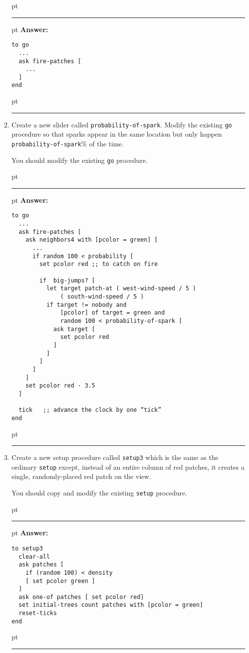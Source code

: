 \documentclass[11pt,oneside]{book}
\begin{document}
\begin{enumerate}
\ifnum{}
 pt
\hrule
{} pt
{\bf Answer: }
\begin{verbatim}
to go
  ...
  ask fire-patches [
    ...
  ]
end
\end{verbatim}
 pt
\hrule
\fi

\item Create a new slider called \texttt{probability-of-spark}. Modify the existing \texttt{go} procedure so that sparks appear in the same location but only happen \texttt{probability-of-spark}\% of the time. 
	
You should modify the existing \texttt{go} procedure.

\ifnum{}
 pt
\hrule
{} pt
{\bf Answer: }
\begin{verbatim}
to go
  ...
  ask fire-patches [
    ask neighbors4 with [pcolor = green] [
      ...
      if random 100 < probability [
        set pcolor red ;; to catch on fire

        if  big-jumps? [
          let target patch-at ( west-wind-speed / 5 ) 
              ( south-wind-speed / 5 ) 
          if target != nobody and 
              [pcolor] of target = green and 
              random 100 < probability-of-spark [
            ask target [
              set pcolor red 
            ] 
          ]
        ]
      ]
    ]
    set pcolor red - 3.5
  ]

  tick   ;; advance the clock by one “tick”
end
\end{verbatim}
 pt
\hrule
\fi

\item Create a new setup procedure called \texttt{setup3} which is the same as the ordinary \texttt{setup} except, instead of an entire column of red patches, it creates a single, randomly-placed red patch on the view.
	
You should copy and modify the existing \texttt{setup} procedure.

\ifnum{}
 pt
\hrule
{} pt
{\bf Answer: }
\begin{verbatim}
to setup3
  clear-all
  ask patches [
    if (random 100) < density 
    [ set pcolor green ] 
  ]
  ask one-of patches [ set pcolor red]
  set initial-trees count patches with [pcolor = green]
  reset-ticks
end
\end{verbatim}
 pt
\hrule
\fi

\end{enumerate}
\end{document}
